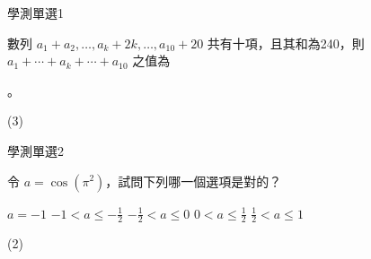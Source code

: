     \begin{QUESTION}
        \begin{ExamInfo}{98}{學測}{單選}{1}
        \end{ExamInfo}
        \begin{ExamAnsRateInfo}{85}{99}{95}{61}
        \end{ExamAnsRateInfo}
        \begin{QBODY}
            數列 $a_1 + a_2, \dots ,a_k +2k , \dots , a_{10} +20$ 共有十項，且其和為240，則 $a_1 + \cdots +a_k + \cdots +a_{10}$ 之值為 
			\begin{QOPS} 
				 。
			\end{QOPS}
        \end{QBODY}
        \begin{QFROMS}
        \end{QFROMS}
        \begin{QTAGS}\end{QTAGS}
        \begin{QANS}
            (3)
        \end{QANS}
        \begin{QSOLLIST}
        \end{QSOLLIST}
        \begin{QEMPTYSPACE}
        \end{QEMPTYSPACE}
    \end{QUESTION}
    \begin{QUESTION}
        \begin{ExamInfo}{98}{學測}{單選}{2}
        \end{ExamInfo}
        \begin{ExamAnsRateInfo}{23}{36}{18}{15}
        \end{ExamAnsRateInfo}
        \begin{QBODY}
            令 $a = \cos (\pi^2 )$，試問下列哪一個選項是對的？
			\begin{QOPS} 
				\QOP $a= -1$
				\QOP $-1< a \leq -\frac{1}{2}$
				\QOP $-\frac{1}{2} < a \leq 0$ 
				\QOP $0 < a \leq \frac{1}{2}$ 
				\QOP $\frac{1}{2} < a \leq 1 $
			\end{QOPS}
        \end{QBODY}
        \begin{QFROMS}
        \end{QFROMS}
        \begin{QTAGS}\end{QTAGS}
        \begin{QANS}
            (2)
        \end{QANS}
        \begin{QSOLLIST}
        \end{QSOLLIST}
        \begin{QEMPTYSPACE}
        \end{QEMPTYSPACE}
    \end{QUESTION}

